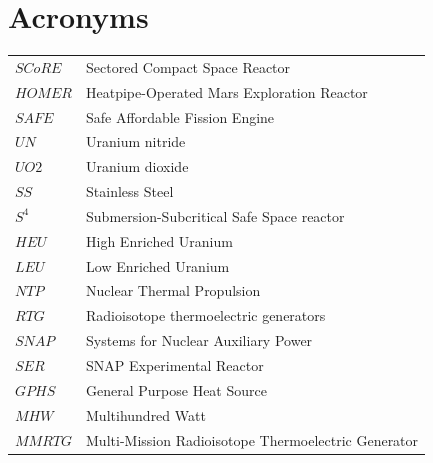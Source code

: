 \documentclass{article}
\begin{document}
\section*{Acronyms}

\begin{tabular}{ l  l }
    $SCoRE$       &Sectored Compact Space Reactor\\
    $HOMER$         &Heatpipe-Operated Mars Exploration Reactor\\
    $SAFE$         &Safe Affordable Fission Engine\\
    $UN$         & Uranium nitride\\
    $UO2$         & Uranium dioxide\\
    $SS$           & Stainless Steel\\
    $S^4$         & Submersion-Subcritical Safe Space reactor\\
    $HEU$         & High Enriched Uranium\\
    $LEU$         & Low Enriched Uranium\\
    $NTP$  & Nuclear Thermal Propulsion\\
    $RTG$  & Radioisotope thermoelectric generators\\
    $SNAP$  & Systems for Nuclear Auxiliary Power\\
    $SER$   & SNAP Experimental Reactor\\
    $GPHS$  & General Purpose Heat Source\\
    $MHW$ & Multihundred Watt\\
    $MMRTG$  & Multi-Mission Radioisotope Thermoelectric Generator\\
 \end{tabular}


\clearpage


\end{document}
